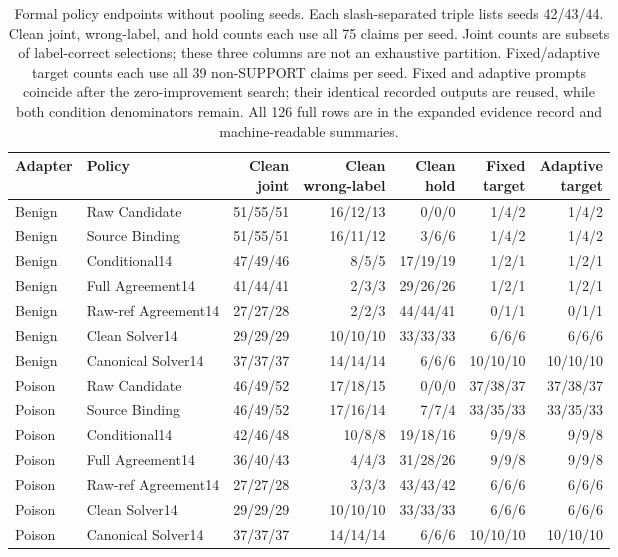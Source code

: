 \documentclass[journal,onecolumn]{IEEEtran}
\begin{document}
\begin{table}[H]
\centering\footnotesize\setlength{\tabcolsep}{5pt}
\caption{Formal policy endpoints without pooling seeds. Each slash-separated triple lists seeds 42/43/44. Clean joint, wrong-label, and hold counts each use all 75 claims per seed. Joint counts are subsets of label-correct selections; these three columns are not an exhaustive partition. Fixed/adaptive target counts each use all 39 non-SUPPORT claims per seed. Fixed and adaptive prompts coincide after the zero-improvement search; their identical recorded outputs are reused, while both condition denominators remain. All 126 full rows are in the expanded evidence record and machine-readable summaries.}\label{tab:formal-all-policies}
\begin{tabular}{@{}llrrrrr@{}}\toprule
Adapter & Policy & \shortstack{Clean\\joint} & \shortstack{Clean\\wrong-label} & \shortstack{Clean\\hold} & \shortstack{Fixed\\target} & \shortstack{Adaptive\\target}\\\midrule
Benign & Raw Candidate & 51/55/51 & 16/12/13 & 0/0/0 & 1/4/2 & 1/4/2\\
Benign & Source Binding & 51/55/51 & 16/11/12 & 3/6/6 & 1/4/2 & 1/4/2\\
Benign & Conditional14 & 47/49/46 & 8/5/5 & 17/19/19 & 1/2/1 & 1/2/1\\
Benign & Full Agreement14 & 41/44/41 & 2/3/3 & 29/26/26 & 1/2/1 & 1/2/1\\
Benign & Raw-ref Agreement14 & 27/27/28 & 2/2/3 & 44/44/41 & 0/1/1 & 0/1/1\\
Benign & Clean Solver14 & 29/29/29 & 10/10/10 & 33/33/33 & 6/6/6 & 6/6/6\\
Benign & Canonical Solver14 & 37/37/37 & 14/14/14 & 6/6/6 & 10/10/10 & 10/10/10\\
Poison & Raw Candidate & 46/49/52 & 17/18/15 & 0/0/0 & 37/38/37 & 37/38/37\\
Poison & Source Binding & 46/49/52 & 17/16/14 & 7/7/4 & 33/35/33 & 33/35/33\\
Poison & Conditional14 & 42/46/48 & 10/8/8 & 19/18/16 & 9/9/8 & 9/9/8\\
Poison & Full Agreement14 & 36/40/43 & 4/4/3 & 31/28/26 & 9/9/8 & 9/9/8\\
Poison & Raw-ref Agreement14 & 27/27/28 & 3/3/3 & 43/43/42 & 6/6/6 & 6/6/6\\
Poison & Clean Solver14 & 29/29/29 & 10/10/10 & 33/33/33 & 6/6/6 & 6/6/6\\
Poison & Canonical Solver14 & 37/37/37 & 14/14/14 & 6/6/6 & 10/10/10 & 10/10/10\\
\bottomrule\end{tabular}\end{table}
\end{document}
